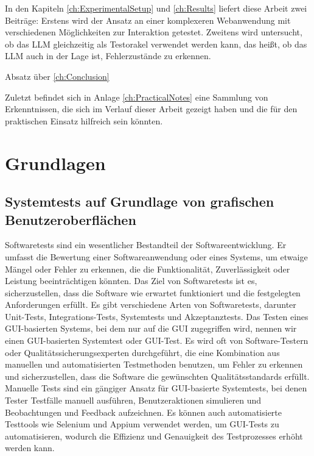 In den Kapiteln \ref{ch:ExperimentalSetup} und \ref{ch:Results} liefert diese Arbeit zwei Beiträge:
Erstens wird der Ansatz an einer komplexeren Webanwendung mit verschiedenen Möglichkeiten zur Interaktion getestet.
Zweitens wird untersucht, ob das LLM gleichzeitig als Testorakel verwendet werden kann, das heißt, ob das LLM auch in der Lage ist, Fehlerzustände zu erkennen.

Absatz über \ref{ch:Conclusion}

Zuletzt befindet sich in Anlage \ref{ch:PracticalNotes} eine Sammlung von Erkenntnissen, die sich im Verlauf dieser Arbeit gezeigt haben und die für den praktischen Einsatz hilfreich sein könnten.



\chapter{Grundlagen}
\label{ch:Foundations}

\section{Systemtests auf Grundlage von grafischen Benutzeroberflächen}
\label{sec:Foundations:GUIBasedSystemTests}
Softwaretests sind ein wesentlicher Bestandteil der Softwareentwicklung.
Er umfasst die Bewertung einer Softwareanwendung oder eines Systems, um etwaige Mängel oder Fehler zu erkennen, die die Funktionalität, Zuverlässigkeit oder Leistung beeinträchtigen könnten.
Das Ziel von Softwaretests ist es, sicherzustellen, dass die Software wie erwartet funktioniert und die festgelegten Anforderungen erfüllt.
Es gibt verschiedene Arten von Softwaretests, darunter Unit-Tests, Integrations-Tests, Systemtests und Akzeptanztests.
Das Testen eines GUI-basierten Systems, bei dem nur auf die GUI zugegriffen wird, nennen wir einen GUI-basierten Systemtest oder GUI-Test.
Es wird oft von Software-Testern oder Qualitätssicherungsexperten durchgeführt, die eine Kombination aus manuellen und automatisierten Testmethoden benutzen, um Fehler zu erkennen und sicherzustellen, dass die Software die gewünschten Qualitätsstandards erfüllt.
Manuelle Tests sind ein gängiger Ansatz für GUI-basierte Systemtests, bei denen Tester Testfälle manuell ausführen, Benutzeraktionen simulieren und Beobachtungen und Feedback aufzeichnen.
Es können auch automatisierte Testtools wie Selenium und Appium verwendet werden, um GUI-Tests zu automatisieren, wodurch die Effizienz und Genauigkeit des Testprozesses erhöht werden kann.

